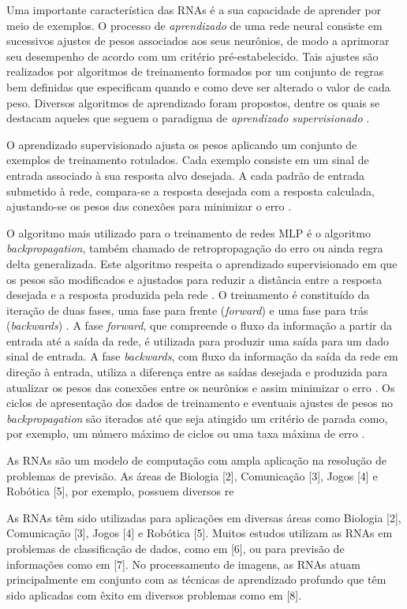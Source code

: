 
Uma importante característica das RNAs é a sua capacidade de aprender por meio de exemplos. O processo de \emph{aprendizado} de uma rede neural consiste em sucessivos ajustes de pesos associados aos seus neurônios, de modo a aprimorar seu desempenho de acordo com um critério pré-estabelecido. Tais ajustes são realizados por algoritmos de treinamento formados por um conjunto de regras bem definidas que especificam quando e como deve ser alterado o valor de cada peso. Diversos algoritmos de aprendizado foram propostos, dentre os quais se destacam aqueles que seguem o paradigma de \emph{aprendizado supervisionado} \cite{ref:faceli,ref:patrick-tcc}.


O aprendizado supervisionado ajusta os pesos aplicando um conjunto de exemplos de treinamento rotulados. Cada exemplo consiste em um sinal de entrada associado à sua resposta alvo desejada. A cada padrão de entrada submetido à rede, compara-se a resposta desejada com a resposta calculada, ajustando-se os pesos das conexões para minimizar o erro \cite{ref:haykin}.


O algoritmo mais utilizado para o treinamento de redes MLP é o algoritmo \emph{backpropagation}, também chamado de retropropagação do erro ou ainda regra delta generalizada. Este algoritmo respeita o aprendizado supervisionado em que os pesos são modificados e ajustados para reduzir a distância entre a resposta desejada e a resposta produzida pela rede \cite{ref:haykin}. O treinamento é constituído da iteração de duas fases, uma fase para frente (\emph{forward}) e uma fase para trás (\emph{backwards}) \cite{ref:faceli}. A fase \emph{forward}, que compreende o fluxo da informação a partir da entrada até a saída da rede, é utilizada para produzir uma saída para um dado sinal de entrada. A fase \emph{backwards}, com fluxo da informação da saída da rede em direção à entrada, utiliza a diferença entre as saídas desejada e produzida para atualizar os pesos das conexões entre os neurônios e assim minimizar o erro \cite{ref:teresa}. Os ciclos de apresentação dos dados de treinamento e eventuais ajustes de pesos no \emph{backpropagation} são iterados até que seja atingido um critério de parada como, por exemplo, um número máximo de ciclos ou uma taxa máxima de erro \cite{ref:faceli}.


As RNAs são um modelo de computação com ampla aplicação na resolução de problemas de previsão. As áreas de Biologia [2], Comunicação [3], Jogos [4] e  Robótica [5], por exemplo, possuem diversos re

As RNAs têm sido utilizadas para aplicações em diversas áreas como Biologia [2], Comunicação [3], Jogos [4] e  Robótica [5]. Muitos estudos utilizam as RNAs em problemas de classificação de dados, como em [6], ou para previsão de informações como em [7]. No processamento de imagens, as RNAs atuam principalmente em conjunto com as técnicas de aprendizado profundo que têm sido aplicadas com êxito em diversos problemas como em [8].
